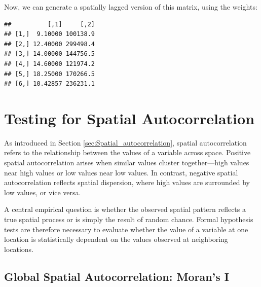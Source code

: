 Now, we can generate a spatially lagged version of this matrix, using the  weights:

\begin{knitrout}
\color{fgcolor}\begin{kframe}
\begin{alltt}
 \hlkwb{<-} \hldef{(}
\end{alltt}
\begin{verbatim}
##          [,1]     [,2]
## [1,]  9.10000 100138.9
## [2,] 12.40000 299498.4
## [3,] 14.00000 144756.5
## [4,] 14.60000 121974.2
## [5,] 18.25000 170266.5
## [6,] 10.42857 236231.1
\end{verbatim}
\end{kframe}
\end{knitrout}


\section{Testing for Spatial Autocorrelation}

As introduced in Section \ref{sec:Spatial_autocorrelation}, spatial autocorrelation refers to the relationship between the values of a variable across space. Positive spatial autocorrelation arises when similar values cluster together—high values near high values or low values near low values. In contrast, negative spatial autocorrelation reflects spatial dispersion, where high values are surrounded by low values, or vice versa.

A central empirical question is whether the observed spatial pattern reflects a true spatial process or is simply the result of random chance. Formal hypothesis tests are therefore necessary to evaluate whether the value of a variable at one location is statistically dependent on the values observed at neighboring locations.


\subsection{Global Spatial Autocorrelation: Moran's I}\label{sec:moransI}

